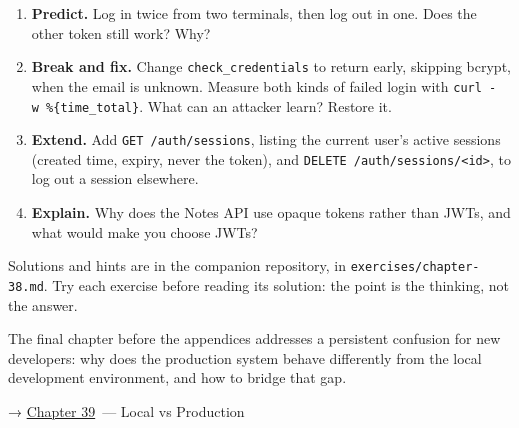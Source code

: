 \label{38-security:exercises}

\begin{enumerate}
\def\labelenumi{\arabic{enumi}.}
\tightlist
\item
  \textbf{Predict.} Log in twice from two terminals, then log out in one. Does the other token still work? Why?
\item
  \textbf{Break and fix.} Change \texttt{check\_credentials} to return early, skipping bcrypt, when the email is unknown. Measure both kinds of failed login with \texttt{curl\ -w\ \%\{time\_total\}}. What can an attacker learn? Restore it.
\item
  \textbf{Extend.} Add \texttt{GET\ /}\allowbreak{}\texttt{auth/}\allowbreak{}\texttt{sessions}, listing the current user's active sessions (created time, expiry, never the token), and \texttt{DELETE\ /}\allowbreak{}\texttt{auth/}\allowbreak{}\texttt{sessions/}\allowbreak{}\texttt{\textless{}id\textgreater{}}, to log out a session elsewhere.
\item
  \textbf{Explain.} Why does the Notes API use opaque tokens rather than JWTs, and what would make you choose JWTs?
\end{enumerate}

\noindent{}Solutions and hints are in the companion repository, in \texttt{exercises/}\allowbreak{}\texttt{chapter-38.md}. Try each exercise before reading its solution: the point is the thinking, not the answer.

\label{38-security:whats-next}

The final chapter before the appendices addresses a persistent confusion for new developers: why does the production system behave differently from the local development environment, and how to bridge that gap.

\noindent{}→ \hyperref[ch:39-local-vs-production]{Chapter 39}~--- Local vs Production
